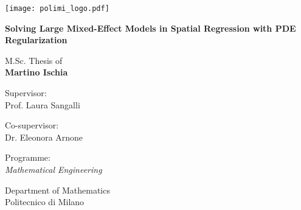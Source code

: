 
\newcommand{\myName}{Martino Ischia}
\newcommand{\myTitle}{Solving Large Mixed-Effect Models in Spatial Regression with PDE Regularization}
\newcommand{\myDegree}{Programme: \protect\\ \textit{Mathematical Engineering}}
\newcommand{\myDepartment}{Department of Mathematics}
\newcommand{\myUni}{Politecnico di Milano}
\newcommand{\myYear}{2021}
\newcommand{\myTime}{01 Sep \myYear}

\begin{titlepage}
	\texttt{[image: polimi\_logo.pdf]}
    \begin{addmargin}[3cm]{-1cm}
		\setlength{\parindent}{0pt}
		\vfill
		
		{
            \Huge\bfseries\myTitle 
            \par
        }
        
        \vspace{2cm}
        
        {\Large M.Sc. Thesis of\\[0.125cm]}
        {\LARGE\bfseries\myName}
        
        \vspace{1cm}
        
        \large
        Supervisor:\\[0.125cm]
        {\Large Prof. Laura Sangalli}
        
        \vspace{0.5cm}
        
        \large
        Co-supervisor:\\[0.125cm]
        {\Large Dr. Eleonora Arnone}
        
        \vspace{2cm}
        
       	\myDegree
	    	
	    \vspace{0.5cm}
	     
	    \myDepartment \\
	    \myUni
        
        \vfill
    \end{addmargin}
\end{titlepage}

